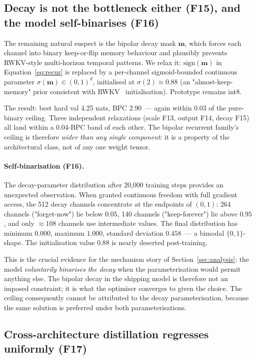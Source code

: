 \documentclass[runningheads]{llncs}
\newcommand{\bm}{\mathbf{m}}
\begin{document}
\subsection{Decay is not the bottleneck either (F15), and the model self-binarises (F16)}
\label{sec:results:decay}

The remaining natural suspect is the bipolar decay mask $\bm$, which
forces each channel into binary keep-or-flip memory behaviour and
plausibly prevents RWKV-style multi-horizon temporal patterns. We
relax it: $\mathrm{sign}(\bm)$ in Equation~\ref{eq:recur} is replaced
by a per-channel sigmoid-bounded continuous parameter $\sigma(\bm)
\in (0,1)^d$, initialised at $\sigma(2)\approx 0.88$ (an
"almost-keep-memory" prior consistent with RWKV~\cite{peng2023rwkv}
initialisation). Prototype remains int8.

The result: best hard val 4.25 nats, BPC $2.90$~--- again within
$0.03$ of the pure-binary ceiling. Three independent relaxations
(scale F13, output F14, decay F15) all land within a $0.04$-BPC band
of each other. The bipolar recurrent family's ceiling is therefore
\emph{wider than any single component}: it is a property of the
architectural class, not of any one weight tensor.

\paragraph{Self-binarisation (F16).}
The decay-parameter distribution after 20{,}000 training steps
provides an unexpected observation. When granted continuous freedom
with full gradient access, the 512 decay channels concentrate at
the endpoints of $(0,1)$: 264 channels ("forget-now") lie below
$0.05$, 140 channels ("keep-forever") lie above $0.95$, and only
${\approx}108$ channels use intermediate values. The final
distribution has minimum $0.000$, maximum $1.000$, standard
deviation $0.458$~--- a bimodal $\{0,1\}$-shape. The initialisation
value $0.88$ is nearly deserted post-training.

This is the crucial evidence for the mechanism story of
Section~\ref{sec:analysis}: the model \emph{voluntarily binarises the
decay} when the parameterisation would permit anything else. The
bipolar decay in the shipping model is therefore not an imposed constraint; it is
what the optimiser converges to given the choice. The ceiling
consequently cannot be attributed to the decay parameterisation,
because the same solution is preferred under both parameterisations.

\subsection{Cross-architecture distillation regresses uniformly (F17)}
\label{sec:results:distill}
\end{document}
